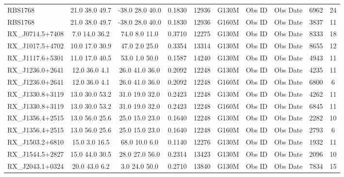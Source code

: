 \documentclass[iop]{emulateapj-rtx4}
\begin{document}
\begin{table}[ht]
\begin{center}
\begin{tabular}{l c c c c c c c c c}
RBS1768  &                 21.0  38.0  49.7  &   -38.0  28.0  40.0  &   0.1830  & 12936  &   G130M  &   Obs ID  & Obs Date  & 6962  &       24         \\
RBS1768  &                 21.0  38.0  49.7  &   -38.0  28.0  40.0  &   0.1830  & 12936  &   G160M  &   Obs ID  & Obs Date  & 3837  &       11         \\
RX\_J0714.5+7408  &         7.0  14.0  36.2  &    74.0  8.0  11.0  &     0.3710  & 12275  &   G130M  &   Obs ID  & Obs Date  & 8333  &       18         \\
RX\_J1017.5+4702  &         10.0  17.0  30.9  &   47.0  2.0  25.0  &     0.3354  & 13314  &   G130M  &   Obs ID  & Obs Date  & 8655  &       12         \\
RX\_J1117.6+5301  &         11.0  17.0  40.5  &   53.0  1.0  50.0  &     0.1587  & 14240  &   G130M  &   Obs ID  & Obs Date  & 4943  &       11         \\
RX\_J1236.0+2641  &         12.0  36.0  4.1  &    26.0  41.0  36.0  &    0.2092  & 12248  &   G130M  &   Obs ID  & Obs Date  & 4235  &       11         \\
RX\_J1236.0+2641  &         12.0  36.0  4.1  &    26.0  41.0  36.0  &    0.2092  & 12248  &   G160M  &   Obs ID  & Obs Date  & 6800  &       6          \\
RX\_J1330.8+3119  &         13.0  30.0  53.2  &   31.0  19.0  32.0  &    0.2423  & 12248  &   G130M  &   Obs ID  & Obs Date  & 4262  &       11         \\
RX\_J1330.8+3119  &         13.0  30.0  53.2  &   31.0  19.0  32.0  &    0.2423  & 12248  &   G160M  &   Obs ID  & Obs Date  & 6845  &       11         \\
RX\_J1356.4+2515  &         13.0  56.0  25.6  &   25.0  15.0  23.0  &    0.1640  & 12248  &   G130M  &   Obs ID  & Obs Date  & 2282  &       10         \\
RX\_J1356.4+2515  &         13.0  56.0  25.6  &   25.0  15.0  23.0  &    0.1640  & 12248  &   G160M  &   Obs ID  & Obs Date  & 2793  &       6          \\
RX\_J1503.2+6810  &         15.0  3.0  16.5  &    68.0  10.0  6.0  &     0.1140  & 12276  &   G130M  &   Obs ID  & Obs Date  & 1932  &       11         \\
RX\_J1544.5+2827  &         15.0  44.0  30.5  &   28.0  27.0  56.0  &    0.2314  & 13423  &   G130M  &   Obs ID  & Obs Date  & 2096  &       10         \\
RX\_J2043.1+0324  &         20.0  43.0  6.2  &    3.0  24.0  50.0  &     0.2710  & 13840  &   G130M  &   Obs ID  & Obs Date  & 7834  &       15         \\

\end{tabular}
\end{center}
\end{table}
\end{document}

